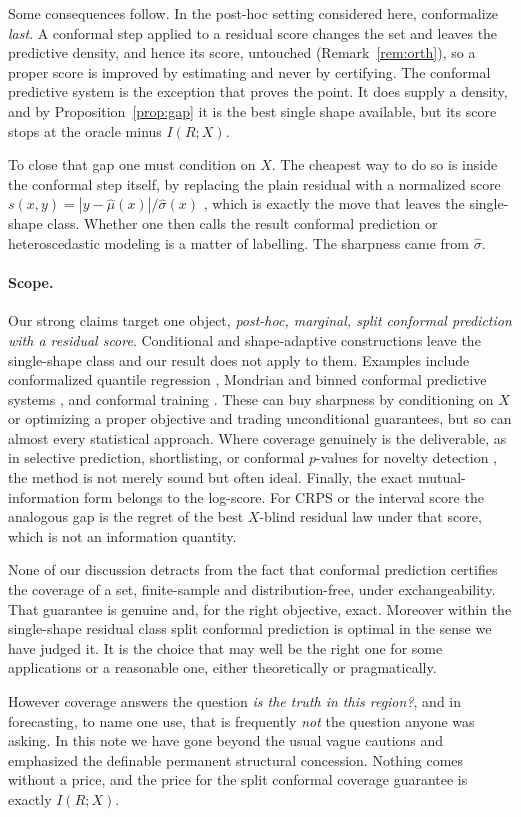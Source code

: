 \documentclass[11pt]{article}
\theoremstyle{definition}
\begin{document}
Some consequences follow. In the post-hoc setting considered here, conformalize \emph{last}.
A conformal step applied to a residual score changes the set and leaves the predictive
density, and hence its score, untouched (Remark~\ref{rem:orth}), so a proper score is
improved by estimating and never by certifying. The conformal predictive system is the
exception that proves the point. It does supply a density, and by
Proposition~\ref{prop:gap} it is the best single shape available, but its score stops at the
oracle minus $I(R;X)$.

To close that gap one must condition on $X$. The cheapest way to do so is inside the
conformal step itself, by replacing the plain residual with a normalized score
$s(x,y)=|y-\hat\mu(x)|/\hat\sigma(x)$ \citep{lei2018distribution}, which is exactly the move
that leaves the single-shape class. Whether one then calls the result conformal prediction
or heteroscedastic modeling is a matter of labelling. The sharpness came from $\hat\sigma$.

\paragraph{Scope.} Our strong claims target one object, \emph{post-hoc, marginal, split
conformal prediction with a residual score}. Conditional and shape-adaptive constructions
leave the single-shape class and our result does not apply to them. Examples include
conformalized quantile regression \citep{romano2019conformalized}, Mondrian and binned
conformal predictive systems \citep{bostrom2021mondrian,toccaceli2026crps}, and conformal
training \citep{stutz2022learning}. These can buy sharpness by conditioning on $X$ or
optimizing a proper objective and trading unconditional guarantees, but so can almost every
statistical approach. Where coverage genuinely is the deliverable, as in selective
prediction, shortlisting, or conformal $p$-values for novelty detection
\citep{angelopoulos2021uncertainty,bates2021distribution}, the method is not merely sound
but often ideal. Finally, the exact mutual-information form belongs to the log-score. For
CRPS or the interval score the analogous gap is the regret of the best $X$-blind residual
law under that score, which is not an information quantity.


None of our discussion detracts from the fact that conformal prediction certifies the coverage
 of a set, finite-sample and distribution-free,
under exchangeability. That guarantee is genuine and, for the right objective, exact. Moreover within
the single-shape residual class split conformal prediction is optimal in the sense we have judged it. It
is the choice that may well be the right one for some applications or a reasonable one, either theoretically or pragmatically.  

However coverage answers the question \emph{is
the truth in this region?}, and in forecasting, to name one use, that is frequently {\em not} the question anyone was
asking.  In this note we have gone beyond the usual vague cautions and emphasized
the definable permanent structural concession. Nothing comes without a price, and 
the price for the split conformal coverage guarantee is exactly $I(R;X)$. 



\end{document}
